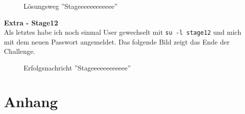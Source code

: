 \documentclass[12pt, a4paper, titlepage, oneside]{scrartcl}
\begin{document}
	\begin{figure}[h!]
		\centering
		\caption{Lösungsweg ''Stageeeeeeeeeeee''}
		\label{fig:stageeeeeeeeeeee_solution}
	\end{figure}
	\newpage

	{\large \textbf{Extra - Stage12}} \\ Als letztes habe ich noch einmal User
	gewechselt mit \lstinline{su -l stage12} und mich mit dem neuen Passwort angemeldet.
	Das folgende Bild zeigt das Ende der Challenge.

	\begin{figure}[h!]
		\centering
		\caption{Erfolgsnachricht ''Stageeeeeeeeeeee''}
		\label{fig:stage_end}
	\end{figure}
	\newpage

	\section{Anhang}
\end{document}
